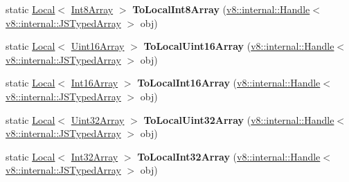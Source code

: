 \begin{DoxyCompactItemize}
\mbox{\label{classv8_1_1Utils_abfaa1700e2a92b3c9c176b730f96aa4c}} 
static \mbox{\hyperlink{classv8_1_1Local}{Local}}$<$ \mbox{\hyperlink{classv8_1_1Int8Array}{Int8\+Array}} $>$ {\bfseries To\+Local\+Int8\+Array} (\mbox{\hyperlink{classv8_1_1internal_1_1Handle}{v8\+::internal\+::\+Handle}}$<$ \mbox{\hyperlink{classv8_1_1internal_1_1JSTypedArray}{v8\+::internal\+::\+J\+S\+Typed\+Array}} $>$ obj)
\item 
\mbox{\label{classv8_1_1Utils_a2a3de4421377bd956ff04955b2d41f6d}} 
static \mbox{\hyperlink{classv8_1_1Local}{Local}}$<$ \mbox{\hyperlink{classv8_1_1Uint16Array}{Uint16\+Array}} $>$ {\bfseries To\+Local\+Uint16\+Array} (\mbox{\hyperlink{classv8_1_1internal_1_1Handle}{v8\+::internal\+::\+Handle}}$<$ \mbox{\hyperlink{classv8_1_1internal_1_1JSTypedArray}{v8\+::internal\+::\+J\+S\+Typed\+Array}} $>$ obj)
\item 
\mbox{\label{classv8_1_1Utils_ac87df11d66de4fdcfed5b558d4d566c0}} 
static \mbox{\hyperlink{classv8_1_1Local}{Local}}$<$ \mbox{\hyperlink{classv8_1_1Int16Array}{Int16\+Array}} $>$ {\bfseries To\+Local\+Int16\+Array} (\mbox{\hyperlink{classv8_1_1internal_1_1Handle}{v8\+::internal\+::\+Handle}}$<$ \mbox{\hyperlink{classv8_1_1internal_1_1JSTypedArray}{v8\+::internal\+::\+J\+S\+Typed\+Array}} $>$ obj)
\item 
\mbox{\label{classv8_1_1Utils_a3ed505929d16003bffd8a4dd0948ad77}} 
static \mbox{\hyperlink{classv8_1_1Local}{Local}}$<$ \mbox{\hyperlink{classv8_1_1Uint32Array}{Uint32\+Array}} $>$ {\bfseries To\+Local\+Uint32\+Array} (\mbox{\hyperlink{classv8_1_1internal_1_1Handle}{v8\+::internal\+::\+Handle}}$<$ \mbox{\hyperlink{classv8_1_1internal_1_1JSTypedArray}{v8\+::internal\+::\+J\+S\+Typed\+Array}} $>$ obj)
\item 
\mbox{\label{classv8_1_1Utils_aa13bae209ba10a9e6b268ead01e12c52}} 
static \mbox{\hyperlink{classv8_1_1Local}{Local}}$<$ \mbox{\hyperlink{classv8_1_1Int32Array}{Int32\+Array}} $>$ {\bfseries To\+Local\+Int32\+Array} (\mbox{\hyperlink{classv8_1_1internal_1_1Handle}{v8\+::internal\+::\+Handle}}$<$ \mbox{\hyperlink{classv8_1_1internal_1_1JSTypedArray}{v8\+::internal\+::\+J\+S\+Typed\+Array}} $>$ obj)
\item 
\mbox{\label{classv8_1_1Utils_a1707f254807f184579ce09e9f544d2d2}} 

\end{DoxyCompactItemize}
